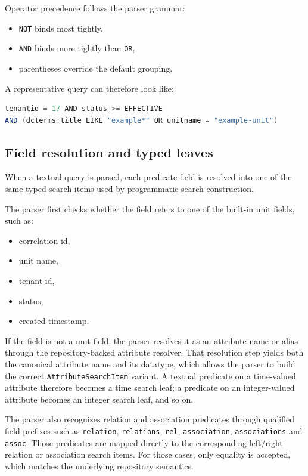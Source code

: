 Operator precedence follows the parser grammar:
\begin{itemize}
\item \texttt{NOT} binds most tightly,
\item \texttt{AND} binds more tightly than \texttt{OR},
\item parentheses override the default grouping.
\end{itemize}

A representative query can therefore look like:

\begin{lstlisting}[language=Java,
    framesep=8pt,
    xleftmargin=5pt,
    framexleftmargin=5pt,
    frame=tb,
    framerule=0pt]
tenantid = 17 AND status >= EFFECTIVE
AND (dcterms:title LIKE "example*" OR unitname = "example-unit")
\end{lstlisting}

\subsection{Field resolution and typed leaves}

When a textual query is parsed, each predicate field is resolved into one of the same typed search items used by programmatic search construction.

The parser first checks whether the field refers to one of the built-in unit fields, such as:
\begin{itemize}
\item correlation id,
\item unit name,
\item tenant id,
\item status,
\item created timestamp.
\end{itemize}

If the field is not a unit field, the parser resolves it as an attribute name or alias through the repository-backed attribute resolver. That resolution step yields both the canonical attribute name and its datatype, which allows the parser to build the correct \texttt{AttributeSearchItem} variant. A textual predicate on a time-valued attribute therefore becomes a time search leaf; a predicate on an integer-valued attribute becomes an integer search leaf, and so on.

The parser also recognizes relation and association predicates through qualified field prefixes such as \texttt{relation}, \texttt{relations}, \texttt{rel}, \texttt{association}, \texttt{associations} and \texttt{assoc}. Those predicates are mapped directly to the corresponding left/right relation or association search items. For those cases, only equality is accepted, which matches the underlying repository semantics.

